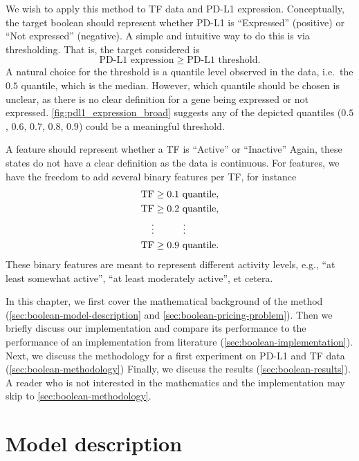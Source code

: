 We wish to apply this method to TF data and PD-L1 expression.
Conceptually, the target boolean should represent whether PD-L1 is ``Expressed'' (positive) or ``Not expressed'' (negative).
A simple and intuitive way to do this is via thresholding.
That is, the target considered is
\[\text{PD-L1 expression} \geq \text{PD-L1 threshold}.\]
A natural choice for the threshold is a quantile level observed in the data, i.e.\ the $0.5$ quantile, which is the median.
However, which quantile should be chosen is unclear, as there is no clear definition for a gene being expressed or not expressed.
\autoref{fig:pdl1_expression_broad} suggests any of the depicted quantiles ($0.5$, $0.6$, $0.7$, $0.8$, $0.9$)
could be a meaningful threshold.

A feature should represent whether a TF is ``Active'' or ``Inactive''
Again, these states do not have a clear definition as the data is continuous.
For features, we have the freedom to add several binary features per TF\@, for instance
\[
    \begin{split}
        \text{TF} &\geq \text{$0.1$ quantile}, \\
        \text{TF} &\geq \text{$0.2$ quantile}, \\
        \vdots & \quad \quad \quad \vdots \\
        \text{TF} &\geq \text{$0.9$ quantile}. \\
    \end{split}
\]
These binary features are meant to represent different activity levels,
e.g., ``at least somewhat active'', ``at least moderately active'', et cetera.

In this chapter, we first cover the mathematical background of the method
(\autoref{sec:boolean-model-description} and \autoref{sec:boolean-pricing-problem}).
Then we briefly discuss our implementation and compare its performance to the performance of an implementation from literature
(\autoref{sec:boolean-implementation}).
Next, we discuss the methodology for a first experiment on PD-L1 and TF data (\autoref{sec:boolean-methodology})
Finally, we discuss the results (\autoref{sec:boolean-results}).
A reader who is not interested in the mathematics and the implementation may skip to \autoref{sec:boolean-methodology}.

\section{Model description}\label{sec:boolean-model-description}


